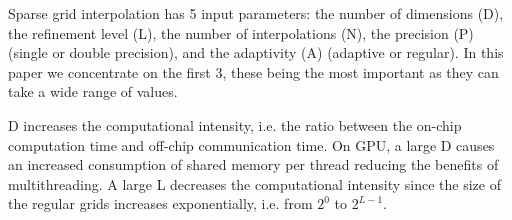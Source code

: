 

Sparse grid interpolation has 5 input parameters: the number of dimensions (D),
the refinement level (L), the number of interpolations (N), the precision (P)
(single or double precision), and the adaptivity (A) (adaptive or regular). In
this paper we concentrate on the first 3, these being the most important as they
can take a wide range of values. 


D increases the computational intensity, i.e. the ratio between the on-chip
computation time and off-chip communication time. On GPU, a large D causes an
increased consumption of shared memory per thread reducing the benefits of
multithreading. A large L decreases the computational intensity since the size
of the regular grids increases exponentially, i.e. from $2^0$ to $2^{L-1}$. 

